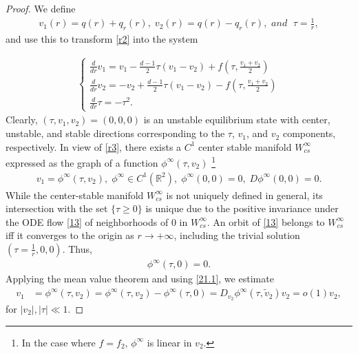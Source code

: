 \documentclass[12pt]{amsart}
\newcommand{\R}{\mathbb R}
\begin{document}
\begin{proof} 


We define
\begin{align}\label{12.1}
v_1(r)=q(r)+q_r(r),\; v_2(r)=q(r)-q_r(r),\textit{ and } \; \tau=\frac 1r,
\end{align}
and use this to transform \eqref{r2} into the system

\begin{align}\label{13}
\begin{cases}
\tfrac d{dr}v_1=v_1-\tfrac{d-1}2\tau(v_1-v_2)+f(\tau, \tfrac{v_1+v_2}2) \\
\tfrac d{dr}v_2=-v_2+\tfrac{d-1}2\tau(v_1-v_2)-f(\tau, \tfrac{v_1+v_2}2)\\
\tfrac d{dr}\tau=-\tau^2. 
\end{cases}
\end{align}
Clearly, $(\tau, v_1, v_2)=(0,0,0)$ is an unstable equilibrium state with center, unstable, and stable directions corresponding to the  $\tau$, $v_1$, and $v_2 $ components, respectively. In view of \eqref{r3}, there exists a $C^1$ center stable manifold $W_{cs}^\infty$  expressed as the graph of a function $\phi^\infty (\tau, v_2)$ \footnote{In the case where $f=f_2$, $\phi^\infty$ is linear in $v_2$.}
\begin{align}\label{21.1}
v_1=\phi^\infty (\tau, v_2), \; \phi^\infty \in C^{1}(\R^2),\; \phi^\infty(0,0)=0, \; D\phi^\infty(0,0)=0.
\end{align}
While the center-stable manifold $W_{cs}^\infty$ is not uniquely defined in general, its intersection with the set $\{\tau\ge0\}$ is unique due to the positive invariance under the ODE flow \eqref{13} of neighborhoods of $0$ in $W_{cs}^\infty$. An orbit of \eqref{13} belongs to $W_{cs}^\infty$ iff 
it converges to the origin as $r\to +\infty$, including the trivial solution $(\tau=\frac 1r, 0, 0)$. Thus,
\begin{align}\label{21.2}
\phi^{\infty}(\tau, 0)=0.
\end{align}
Applying the mean value theorem and using \eqref{21.1}, we estimate
\begin{align}
v_1&=\phi^{\infty}(\tau, v_2)=\phi^{\infty}(\tau, v_2)-\phi^{\infty}(\tau, 0)=D_{v_2}\phi^{\infty}(\tau, \tilde v_2) v_2 =o(1) v_2,\label{22.1}
\end{align}
for $|v_2|, |\tau|\ll 1$. 


\end{proof}
\end{document}
